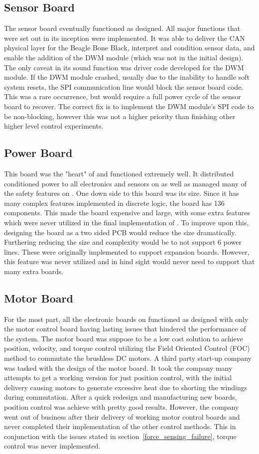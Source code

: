 \begin{appendices}
\subsection{Sensor Board}
The sensor board eventually functioned as designed.
All major functions that were set out in its inception were implemented.
It was able to deliver the CAN physical layer for the Beagle Bone Black, interpret and condition sensor data, and enable the addition of the DWM module (which was not in the initial design).
The only caveat in its sound function was driver code developed for the DWM module.
If the DWM module crashed, usually due to the inability to handle soft system resets, the SPI communication line would block the sensor board code.
This was a rare occurrence, but would require a full power cycle of the sensor board to recover.
The correct fix is to implement the DWM module's SPI code to be non-blocking, however this was not a higher priority than finishing other higher level control experiments.

\subsection{Power Board}
This board was the "heart" of \SB{} and functioned extremely well.
It distributed conditioned power to all electronics and sensors on \SB{} as well as managed many of the safety features on \SB{}.
One down side to this board was its size.
Since it has many complex features implemented in discrete logic, the board has 136 components.
This made the board expensive and large, with some extra features which were never utilized in the final implementation of \SB{}.
To improve upon this, designing the board as a two sided PCB would reduce the size dramatically.
Furthering reducing the size and complexity would be to not support 6 power lines.
These were originally implemented to support expansion boards.
However, this feature was never utilized and in hind sight would never need to support that many extra boards.

\subsection{Motor Board}
For the most part, all the electronic boards on \SB{} functioned as designed with only the motor control board having lasting issues that hindered the performance of the system.
The motor board was suppose to be a low cost solution to achieve position, velocity, and torque control utilizing the Field Oriented Control (FOC) method to commutate the brushless DC motors.
A third party start-up company was tasked with the design of the motor board.
It took the company many attempts to get a working version for just position control, with the initial delivery causing motors to generate excessive heat due to shorting the windings during commutation.
After a quick redesign and manufacturing new boards, position control was achieve with pretty good results.
However, the company went out of business after their delivery of working motor control boards and never completed their implementation of the other control methods.
This in conjunction with the issues stated in section~\ref{force_sensing_failure}, torque control was never implemented.


\end{appendices}
